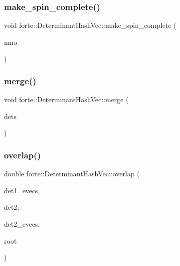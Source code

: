\mbox{\label{classforte_1_1_determinant_hash_vec_aadea7fce2c583d922a696093d2888619}} 
\subsubsection{\texorpdfstring{make\+\_\+spin\+\_\+complete()}{make\_spin\_complete()}}
{\footnotesize\ttfamily void forte\+::\+Determinant\+Hash\+Vec\+::make\+\_\+spin\+\_\+complete (\begin{DoxyParamCaption}\item[{int}]{nmo }\end{DoxyParamCaption})}

\mbox{\label{classforte_1_1_determinant_hash_vec_a76bbc710a7fe975f008a5b41cc10f85c}} 
\subsubsection{\texorpdfstring{merge()}{merge()}}
{\footnotesize\ttfamily void forte\+::\+Determinant\+Hash\+Vec\+::merge (\begin{DoxyParamCaption}\item[{\mbox{\hyperlink{classforte_1_1_determinant_hash_vec}{Determinant\+Hash\+Vec}} \&}]{dets }\end{DoxyParamCaption})}

\mbox{\label{classforte_1_1_determinant_hash_vec_ad4f538593c5f1d98da9a73e5462d3bfa}} 
\subsubsection{\texorpdfstring{overlap()}{overlap()}\hspace{0.1cm}{\footnotesize\ttfamily [1/2]}}
{\footnotesize\ttfamily double forte\+::\+Determinant\+Hash\+Vec\+::overlap (\begin{DoxyParamCaption}\item[{std\+::vector$<$ double $>$ \&}]{det1\+\_\+evecs,  }\item[{\mbox{\hyperlink{classforte_1_1_determinant_hash_vec}{Determinant\+Hash\+Vec}} \&}]{det2,  }\item[{std\+::shared\+\_\+ptr$<$ psi\+::\+Matrix $>$}]{det2\+\_\+evecs,  }\item[{int}]{root }\end{DoxyParamCaption})}

